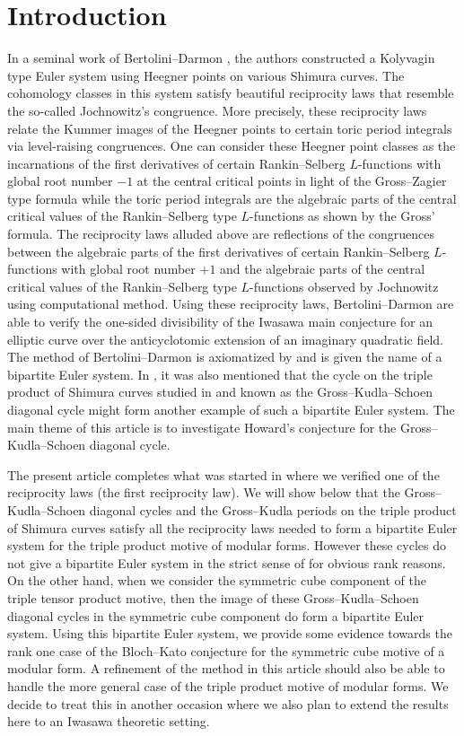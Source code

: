 \documentclass[10pt]{amsart}
\numberwithin{equation}{section}
\theoremstyle{plain}
\numberwithin{equation}{section}
\theoremstyle{definition}
\theoremstyle{remark}
\begin{document}
\section{Introduction}
In a seminal work of Bertolini--Darmon \cite{BD}, the authors constructed a Kolyvagin type Euler system using Heegner points on various Shimura curves. The cohomology classes in this system satisfy beautiful reciprocity laws that resemble the so-called Jochnowitz's congruence. More precisely, these reciprocity laws relate the Kummer images of the Heegner points to certain toric period integrals via level-raising congruences. One can consider these Heegner point classes as the incarnations of the first derivatives of certain Rankin--Selberg $L$-functions with global root number $-1$ at the central critical points in light of the Gross--Zagier type formula while the toric period integrals are the algebraic parts of the central critical values of the Rankin--Selberg type $L$-functions as shown by the Gross' formula. The reciprocity laws alluded above are reflections of the congruences between the algebraic parts of the first derivatives of certain Rankin--Selberg $L$-functions with global root number $+1$ and  the algebraic parts of the central critical values of the Rankin--Selberg type $L$-functions observed by Jochnowitz using computational method. Using these reciprocity laws,  Bertolini--Darmon are able to verify the one-sided divisibility of the Iwasawa main conjecture for an elliptic curve over the anticyclotomic extension of an imaginary quadratic field. The method of Bertolini--Darmon is axiomatized by \cite{How} and is given the name of a bipartite Euler system. In \cite{How}, it was also mentioned that the cycle on the triple product of Shimura curves studied in \cite{GK} and \cite{GS} known as the Gross--Kudla--Schoen diagonal cycle might form another example of such a bipartite Euler system. The main theme of this article is to investigate Howard's conjecture for the Gross--Kudla--Schoen diagonal cycle.

The present article completes what was started in \cite{Wang} where we verified one of the reciprocity laws (the first reciprocity law). We will show below that the Gross--Kudla--Schoen diagonal cycles and the Gross--Kudla periods on the triple product of Shimura curves satisfy all the reciprocity laws needed to form a bipartite Euler system for the triple product motive of modular forms. However these cycles do not give a bipartite Euler system in the strict sense of \cite{How} for obvious rank reasons.  On the other hand, when we consider the symmetric cube component of the triple tensor product motive, then the image of these Gross--Kudla--Schoen diagonal cycles in the symmetric cube component do form a bipartite Euler system. Using this bipartite Euler system,  we provide some evidence towards the rank one case of the Bloch--Kato conjecture for the symmetric cube motive of a modular form. A refinement of the method in this article should also be able to handle the more general case of the triple product motive of modular forms. We decide to treat this in another occasion where we also plan to extend the results here to an Iwasawa theoretic setting.
\end{document}

